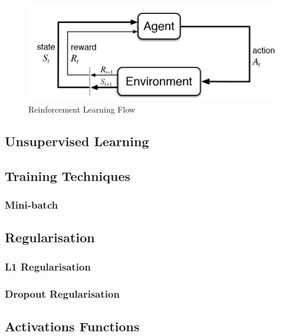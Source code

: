 \documentclass[11pt]{article}
\begin{document}
\begin{figure}[h]
\centering
	\includegraphics[scale=0.5]{images/reinforcement}
	\caption{Reinforcement Learning Flow}
	\label{fig: reinforcement_flow}
\end{figure}
\subsection{Unsupervised Learning}

\subsection{Training Techniques}
\subsubsection{Mini-batch}
\subsection{Regularisation}
\subsubsection{L1 Regularisation}
\subsubsection{Dropout Regularisation}
\subsection{Activations Functions}
\end{document}
